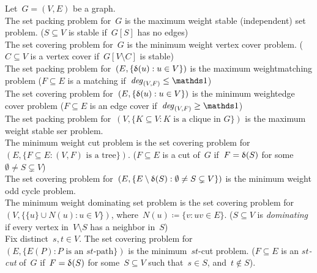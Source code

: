 \documentclass[main.tex]{subfiles}
\begin{document}
Let~$G=(V,E)$ be a graph. \\

The set packing problem for~$G$ is the maximum weight stable (independent) set problem. ($S \subseteq V$ is stable if~$G[S]$ has no edges) \\

The set covering problem for~$G$ is the minimum weight vertex cover problem. ($C \subseteq V$ is a vertex cover if~$G[V \setminus C]$ is stable) \\

The set packing problem for~$(E, \{\updelta(u) : u \in V\})$ is the maximum weightmatching problem ($F \subseteq E$ is a matching if~$\mathit{deg}_{(V, F)} \leq \ones$) \\

The set covering problem for~$(E, \{\updelta(u) : u \in V\})$ is the minimum weightedge cover problem ($F \subseteq E$ is an edge cover if~$\mathit{deg}_{(V, F)} \geq \ones$) \\

The set packing problem for~$(V, \{K \subseteq V : K \text{ is a clique in } G\})$ is the maximum weight stable ser problem. \\

The minimum weight cut problem is the set covering problem for~$(E, \{F \subseteq E : (V, F) \text{ is a tree}\})$. ($F \subseteq E$ is a cut of~$G$ if~$F = \updelta(S)$ for some~$\emptyset \neq S \subsetneq V$) \\

The set covering problem for~$(E, \{E \setminus \updelta(S) : \emptyset \neq S \subsetneq V\})$ is the minimum weight odd cycle problem. \\

The minimum weight dominating set problem is the set covering problem for~$(V, \{\{u\} \cup N(u) : u \in V\})$, where~$N(u) \coloneqq \{v : uv \in E\}$. ($S \subseteq V$ is \emph{dominating} if every vertex in~$V \setminus S$ has a neighbor in~$S$) \\

Fix distinct~$s, t \in V$. The set covering problem for~$(E, \{E(P) : P \text{ is an $st$-path}\})$ is the minimum~$st$-cut problem. ($F \subseteq E$ is an \emph{$st$-cut} of~$G$ if~$F = \updelta(S)$ for some~$S \subseteq V$ such that~$s \in S$, and~$t \not\in S$).
\end{document}
